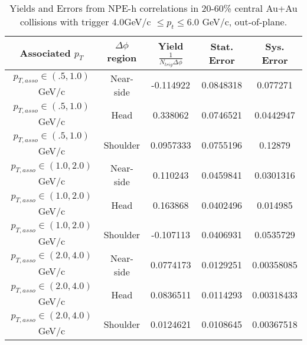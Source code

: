 \begin{table}
\centering
\begin{tabular}{|c|c|c|c|c|}
\hline
Associated $p_T$    & $\Delta\phi$ region & Yield $\frac{1}{N_{trig} \Delta\phi}$ & Stat. Error & Sys. Error\\
\hline
$p_{T,asso} \in(.5, 1.0)$ GeV/c  & Near-side & -0.114922 & 0.0848318 & 0.077271 \\
\hline
$p_{T,asso} \in(.5, 1.0)$ GeV/c  & Head & 0.338062 & 0.0746521 & 0.0442947 \\
\hline
$p_{T,asso} \in(.5, 1.0)$ GeV/c  & Shoulder & 0.0957333 & 0.0755196 & 0.12879 \\
\hline
$p_{T,asso} \in(1.0, 2.0)$ GeV/c  & Near-side & 0.110243 & 0.0459841 & 0.0301316 \\
\hline
$p_{T,asso} \in(1.0, 2.0)$ GeV/c  & Head & 0.163868 & 0.0402496 & 0.014985 \\
\hline
$p_{T,asso} \in(1.0, 2.0)$ GeV/c  & Shoulder & -0.107113 & 0.0406931 & 0.0535729 \\
\hline
$p_{T,asso} \in(2.0, 4.0)$ GeV/c  & Near-side & 0.0774173 & 0.0129251 & 0.00358085 \\
\hline
$p_{T,asso} \in(2.0, 4.0)$ GeV/c  & Head & 0.0836511 & 0.0114293 & 0.00318433 \\
\hline
$p_{T,asso} \in(2.0, 4.0)$ GeV/c  & Shoulder & 0.0124621 & 0.0108645 & 0.00367518 \\
\hline
\end{tabular}
\caption[Yields and Errors in Au+Au Correlations, Out-of-Plane, 20-60\%, Low Trigger]{Yields and Errors from NPE-h correlations in 20-60\% central Au+Au collisions with trigger $4.0 $GeV/c $\leq p_t \leq 6.0$ GeV/c, out-of-plane.}
\label{tab:OutPlaneLow}
\end{table}

